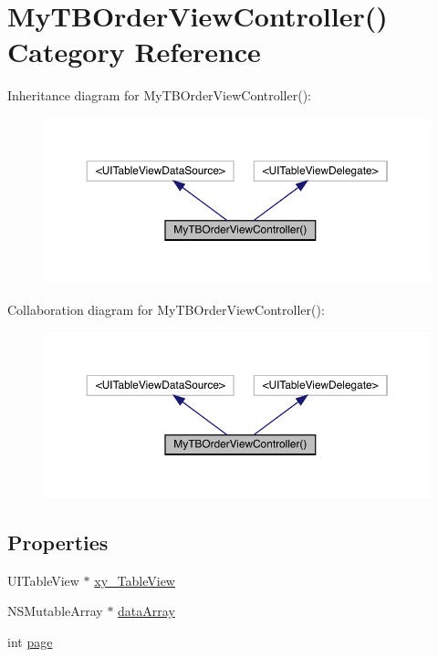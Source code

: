 \hypertarget{category_my_t_b_order_view_controller_07_08}{}\section{My\+T\+B\+Order\+View\+Controller() Category Reference}
\label{category_my_t_b_order_view_controller_07_08}


Inheritance diagram for My\+T\+B\+Order\+View\+Controller()\+:\nopagebreak
\begin{figure}[H]
\begin{center}
\leavevmode
\includegraphics[width=350pt]{category_my_t_b_order_view_controller_07_08__inherit__graph}
\end{center}
\end{figure}


Collaboration diagram for My\+T\+B\+Order\+View\+Controller()\+:\nopagebreak
\begin{figure}[H]
\begin{center}
\leavevmode
\includegraphics[width=350pt]{category_my_t_b_order_view_controller_07_08__coll__graph}
\end{center}
\end{figure}
\subsection*{Properties}
\begin{DoxyCompactItemize}
\item 
U\+I\+Table\+View $\ast$ \mbox{\hyperlink{category_my_t_b_order_view_controller_07_08_ac614fb5d02fddf49ce06d99fb2bb0060}{xy\+\_\+\+Table\+View}}
\item 
N\+S\+Mutable\+Array $\ast$ \mbox{\hyperlink{category_my_t_b_order_view_controller_07_08_acf0f90b953a8e670c5b2623958f98788}{data\+Array}}
\item 
int \mbox{\hyperlink{category_my_t_b_order_view_controller_07_08_adab9692a09b8a69711202cdc0bebe101}{page}}
\end{DoxyCompactItemize}


